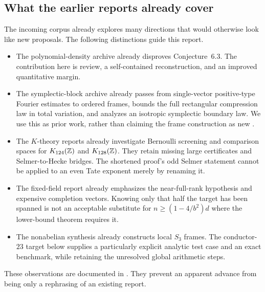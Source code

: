 \subsection{What the earlier reports already cover}

The incoming corpus already explores many directions that would otherwise
look like new proposals. The following distinctions guide this report.

\begin{itemize}
\item The polynomial-density archive already disproves Conjecture~6.3.
The contribution here is review, a self-contained reconstruction, and an
improved quantitative margin.
\item The symplectic-block archive already passes from single-vector
positive-type Fourier estimates to ordered frames, bounds the full
rectangular compression law in total variation, and analyzes an isotropic
symplectic boundary law. We use this as prior work, rather than claiming
the frame construction as new \cite{priorSymplectic}.
\item The \(K\)-theory reports already investigate Bernoulli screening and
comparison spaces for \(K_{124}(\mathbb Z)\) and \(K_{128}(\mathbb Z)\). They retain missing
large certificates and Selmer-to-Hecke bridges. The shortened proof's odd
Selmer statement cannot be applied to an even Tate exponent merely by
renaming it.
\item The fixed-field report already emphasizes the near-full-rank
hypothesis and expensive completion vectors. Knowing only that half the
target has been spanned is not an acceptable substitute for
\(n\ge(1-4/b^2)d\) where the lower-bound theorem requires it.
\item The nonabelian synthesis already constructs local \(S_3\) frames.
The conductor-\(23\) target below supplies a particularly explicit analytic
test case and an exact benchmark, while retaining the unresolved global
arithmetic steps.
\end{itemize}

These observations are documented in
. They prevent an apparent advance
from being only a rephrasing of an existing report.
